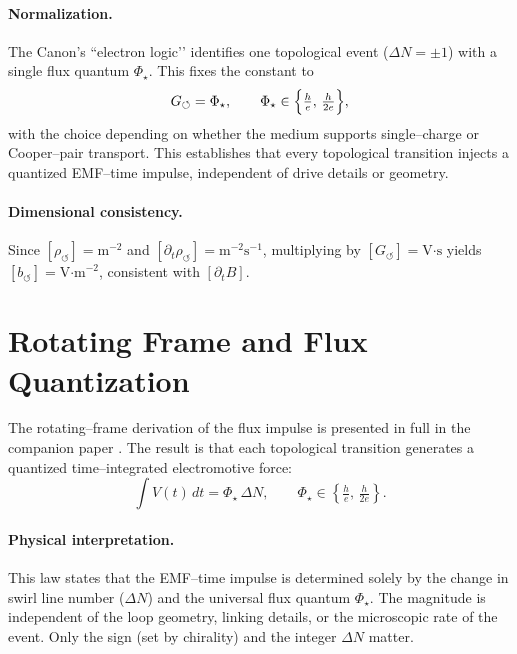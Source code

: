 \documentclass[reprint,aps,onecolumn,nofootinbib]{revtex4-2}
\begin{document}
        \paragraph*{Normalization.}
        The Canon’s “electron logic’’ identifies one topological event ($\Delta N = \pm 1$) with a single flux
        quantum $\Phi_\star$. This fixes the constant to
        \[
        G_{\circlearrowleft} = \Phi_\star,
        \qquad
        \Phi_\star \in \Bigl\{ \tfrac{h}{e},\,\tfrac{h}{2e} \Bigr\},
        \]
        with the choice depending on whether the medium supports single–charge or Cooper–pair transport.
        This establishes that every topological transition injects a quantized EMF–time impulse, independent
        of drive details or geometry.

        \paragraph*{Dimensional consistency.}
        Since $[\rho_{\circlearrowleft}] = \text{m}^{-2}$ and $[\partial_t \rho_{\circlearrowleft}] =
        \text{m}^{-2}\text{s}^{-1}$, multiplying by $[G_{\circlearrowleft}] = \text{V·s}$ yields
        $[b_{\circlearrowleft}] = \text{V·m}^{-2}$, consistent with $[\partial_t B]$.

    \section{Rotating Frame and Flux Quantization}
    \label{sec:rotating-frame-and-flux-quantization}

        The rotating–frame derivation of the flux impulse is presented in full in the companion paper
        \cite{Iskandarani2025EMG}. The result is that each topological transition generates a quantized
        time–integrated electromotive force:
        \[
        \int V(t)\,dt = \Phi_\star \,\Delta N,
        \qquad
        \Phi_\star \in \left\{ \tfrac{h}{e}, \,\tfrac{h}{2e} \right\}.
        \]

        \paragraph*{Physical interpretation.}
        This law states that the EMF–time impulse is determined solely by the change in swirl line number
        ($\Delta N$) and the universal flux quantum $\Phi_\star$. The magnitude is independent of the loop
        geometry, linking details, or the microscopic rate of the event. Only the sign (set by chirality) and
        the integer $\Delta N$ matter.
\end{document}
